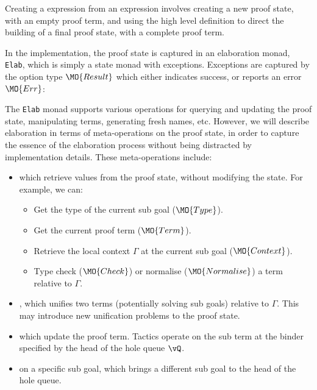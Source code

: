 Creating a \TT{} expression from an \Idris{} expression involves creating
a new proof state, with an empty proof term, and using the high level definition
to direct the building of a final proof state, with a complete proof term.

In the implementation, the proof state is captured in an elaboration monad,
\texttt{Elab}, which is simply a state monad with exceptions. 
Exceptions are captured by the option type $\MO{Result}$ which
either indicates success, or reports an error $\MO{Err}$:


The \texttt{Elab} monad supports various operations for querying and updating
the proof state, manipulating terms, generating fresh names, etc. However, we
will describe \Idris{} elaboration in terms of meta-operations on the proof
state, in order to capture the essence of the elaboration process without being
distracted by implementation details. These meta-operations include: 

\begin{itemize}
\item {} which retrieve values from the proof state, without modifying
the state. For example, we can:
\begin{itemize}
\item Get the type of the current sub goal ($\MO{Type}$).
\item Get the current proof term ($\MO{Term}$).
\item Retrieve the local context $\Gamma$ at the current sub goal
($\MO{Context}$).
\item Type check ($\MO{Check}$) or normalise ($\MO{Normalise}$) a term relative
to $\Gamma$.
\end{itemize}
\item {}, which unifies two terms (potentially solving sub
goals) relative to $\Gamma$. This may introduce new unification problems
to the proof state.
\item {} which update the proof term. Tactics operate on the sub term
at the binder specified by the head of the hole queue $\vQ$.
\item {} on a specific sub goal, which brings a different sub goal to the
head of the hole queue.
\end{itemize}

